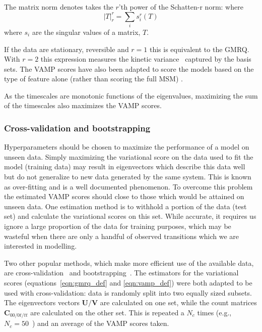 \documentclass[journal=jacsat,manuscript=article]{achemso}
\begin{document}
The matrix norm denotes takes the $r$'th power of the Schatten-r norm: 
where
\begin{equation}
    \left | T \right |_{r}^{r} = \sum_{i}s_i^r(T)
\end{equation}
where $s_i$ are the singular values of a matrix, $T$. 

If the data are stationary, reversible and $r=1$ this is equivalent to the GMRQ. With $r=2$ this expression measures the kinetic variance~\cite{noeKineticDistanceKinetic2015} captured by the basis sets. The VAMP scores have also been adapted to score the models based on the type of feature alone (rather than scoring the full MSM) \cite{scherer_variational_2019}. 

As the timescales are monotonic functions of the eigenvalues, maximizing the sum of the timescales also maximizes the VAMP scores. 

\subsubsection{Cross-validation and bootstrapping}

Hyperparameters should be chosen to maximize the performance of a model on unseen data. Simply maximizing the variational score on the data used to fit the model (training data) may result in eigenvectors which describe this data well but do not generalize to new data generated by the same system. This is known as over-fitting and is a well documented phenomenon\cite{friedman2001elements}. To overcome this problem the estimated VAMP scores should close to those which would be attained on unseen data. One estimation method is to withhold a portion of the data (test set) and calculate the variational scores on this set. While accurate, it requires us ignore a large proportion of the data for training purposes, which may be wasteful when there are only a handful of observed transitions which we are interested in modelling. 

Two other popular methods, which make more efficient use of the available data,  are cross-validation~\cite{arlotSurveyCrossvalidationProcedures2009} and bootstrapping~\cite{efronIntroductionBootstrap1993}. The estimators for the variational scores (equations~\ref{eqn:gmrq_def} and \ref{eqn:vamp_def}) were both adapted to be used with cross-validation\cite{wuVariationalApproachLearning2020c, mcgibbonVariationalCrossvalidationSlow2015}: data is randomly split into two equally sized subsets. The eigenvectors vectors $\mathbf{U}/\mathbf{V}$ are calculated on one set, while the count matrices $\mathbf{C}_{00/0t/tt}$ are calculated on the other set.  This is repeated a $N_c$ times (e.g., $N_c =50$~\cite{scherer_variational_2019}) and an average of the VAMP scores taken.
\end{document}
